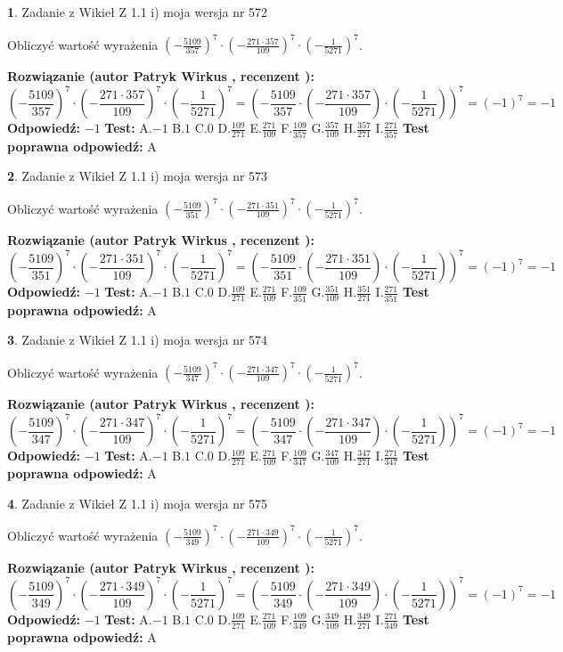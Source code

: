 \documentclass[12pt, a4paper]{article}
\theoremstyle{definition} %
\newtheorem{zad}{}
\newcommand{\zadStart}[1]{\begin{zad}#1\newline}
\newcommand{\zadStop}{\end{zad}}
\newcommand{\rozwStart}[2]{\noindent \textbf{Rozwiązanie (autor #1 , recenzent #2): }\newline}
\newcommand{\rozwStop}{\newline}
\newcommand{\odpStart}{\noindent \textbf{Odpowiedź:}\newline}
\newcommand{\odpStop}{\newline}
\newcommand{\testStart}{\noindent \textbf{Test:}\newline}
\newcommand{\testStop}{\newline}
\newcommand{\kluczStart}{\noindent \textbf{Test poprawna odpowiedź:}\newline}
\newcommand{\kluczStop}{\newline}
\begin{document}
\zadStart{Zadanie z Wikieł Z 1.1 i) moja wersja nr 572}

Obliczyć wartość wyrażenia $(-\frac{5109}{357})^{7} \cdot (-\frac{271 \cdot 357}{109})^{7} \cdot (-\frac{1}{5271})^{7}$.
\zadStop
\rozwStart{Patryk Wirkus}{}
$$(-\frac{5109}{357})^{7} \cdot (-\frac{271 \cdot 357}{109})^{7} \cdot (-\frac{1}{5271})^{7} = (-\frac{5109}{357} \cdot (-\frac{271 \cdot 357}{109}) \cdot (-\frac{1}{5271}))^{7} = (-1)^{7} = -1$$
\rozwStop
\odpStart
$-1$
\odpStop
\testStart
A.$-1$ B.$1$ C.$0$ D.$\frac{109}{271}$ E.$\frac{271}{109}$
F.$\frac{109}{357}$ G.$\frac{357}{109}$
H.$\frac{357}{271}$
I.$\frac{271}{357}$
\testStop
\kluczStart
A
\kluczStop



\zadStart{Zadanie z Wikieł Z 1.1 i) moja wersja nr 573}

Obliczyć wartość wyrażenia $(-\frac{5109}{351})^{7} \cdot (-\frac{271 \cdot 351}{109})^{7} \cdot (-\frac{1}{5271})^{7}$.
\zadStop
\rozwStart{Patryk Wirkus}{}
$$(-\frac{5109}{351})^{7} \cdot (-\frac{271 \cdot 351}{109})^{7} \cdot (-\frac{1}{5271})^{7} = (-\frac{5109}{351} \cdot (-\frac{271 \cdot 351}{109}) \cdot (-\frac{1}{5271}))^{7} = (-1)^{7} = -1$$
\rozwStop
\odpStart
$-1$
\odpStop
\testStart
A.$-1$ B.$1$ C.$0$ D.$\frac{109}{271}$ E.$\frac{271}{109}$
F.$\frac{109}{351}$ G.$\frac{351}{109}$
H.$\frac{351}{271}$
I.$\frac{271}{351}$
\testStop
\kluczStart
A
\kluczStop



\zadStart{Zadanie z Wikieł Z 1.1 i) moja wersja nr 574}

Obliczyć wartość wyrażenia $(-\frac{5109}{347})^{7} \cdot (-\frac{271 \cdot 347}{109})^{7} \cdot (-\frac{1}{5271})^{7}$.
\zadStop
\rozwStart{Patryk Wirkus}{}
$$(-\frac{5109}{347})^{7} \cdot (-\frac{271 \cdot 347}{109})^{7} \cdot (-\frac{1}{5271})^{7} = (-\frac{5109}{347} \cdot (-\frac{271 \cdot 347}{109}) \cdot (-\frac{1}{5271}))^{7} = (-1)^{7} = -1$$
\rozwStop
\odpStart
$-1$
\odpStop
\testStart
A.$-1$ B.$1$ C.$0$ D.$\frac{109}{271}$ E.$\frac{271}{109}$
F.$\frac{109}{347}$ G.$\frac{347}{109}$
H.$\frac{347}{271}$
I.$\frac{271}{347}$
\testStop
\kluczStart
A
\kluczStop



\zadStart{Zadanie z Wikieł Z 1.1 i) moja wersja nr 575}

Obliczyć wartość wyrażenia $(-\frac{5109}{349})^{7} \cdot (-\frac{271 \cdot 349}{109})^{7} \cdot (-\frac{1}{5271})^{7}$.
\zadStop
\rozwStart{Patryk Wirkus}{}
$$(-\frac{5109}{349})^{7} \cdot (-\frac{271 \cdot 349}{109})^{7} \cdot (-\frac{1}{5271})^{7} = (-\frac{5109}{349} \cdot (-\frac{271 \cdot 349}{109}) \cdot (-\frac{1}{5271}))^{7} = (-1)^{7} = -1$$
\rozwStop
\odpStart
$-1$
\odpStop
\testStart
A.$-1$ B.$1$ C.$0$ D.$\frac{109}{271}$ E.$\frac{271}{109}$
F.$\frac{109}{349}$ G.$\frac{349}{109}$
H.$\frac{349}{271}$
I.$\frac{271}{349}$
\testStop
\kluczStart
A
\kluczStop
\end{document}
